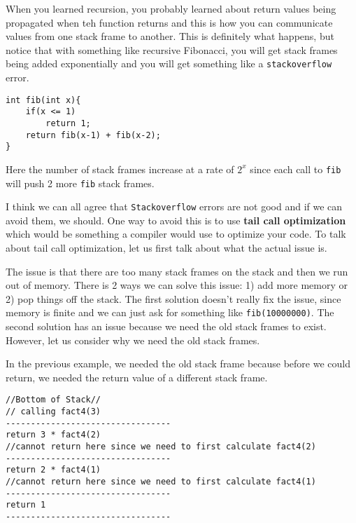 \documentclass[main.tex]{subfiles}
\begin{document}
When you learned recursion, you probably learned about return values being propagated when teh function returns and this is how you can communicate values from one stack frame to another. This is definitely what happens, but notice that with something like recursive Fibonacci, you will get stack frames being added exponentially and you will get something like a \texttt{stackoverflow} error. 
\begin{lstlisting}[style=Mycstyle]
int fib(int x){
    if(x <= 1)
        return 1;
    return fib(x-1) + fib(x-2);
}
\end{lstlisting}
Here the number of stack frames increase at a rate of $2^x$ since each call to \texttt{fib} will push 2 more \texttt{fib} stack frames. 

I think we can all agree that \texttt{Stackoverflow} errors are not good and if we can avoid them, we should. One way to avoid this is to use \textbf{tail call optimization} which would be something a compiler would use to optimize your code. To talk about tail call optimization, let us first talk about what the actual issue is. 

The issue is that there are too many stack frames on the stack and then we run out of memory. There is 2 ways we can solve this issue: 1) add more memory or 2) pop things off the stack. The first solution doesn't really fix the issue, since memory is finite and we can just ask for something like \texttt{fib(10000000)}. The second solution has an issue because we need the old stack frames to exist. However, let us consider why we need the old stack frames. 

In the previous example, we needed the old stack frame because before we could return, we needed the return value of a different stack frame. 
\begin{lstlisting}[style=Mycstyle]
//Bottom of Stack//
// calling fact4(3)
---------------------------------
return 3 * fact4(2) 
//cannot return here since we need to first calculate fact4(2)
---------------------------------
return 2 * fact4(1) 
//cannot return here since we need to first calculate fact4(1)
---------------------------------
return 1
---------------------------------
\end{lstlisting}
\end{document}
